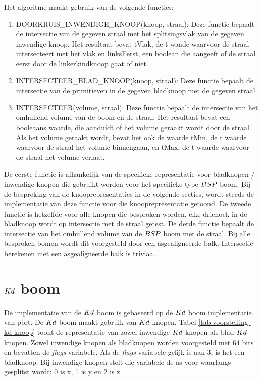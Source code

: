 Het algoritme maakt gebruik van de volgende functies:
\begin{enumerate}
    \item DOORKRUIS\_INWENDIGE\_KNOOP(knoop, straal): Deze functie bepaalt de intersectie van de gegeven straal met het splitsingsvlak van de gegeven inwendige knoop. Het resultaat bevat tVlak, de t waade waarvoor de straal intersecteert met het vlak en linksEerst, een boolean die aangeeft of de straal eerst door de linkerkindknoop gaat of niet.
    \item INTERSECTEER\_BLAD\_KNOOP(knoop, straal): Deze functie bepaalt de intersectie van de primitieven in de gegeven bladknoop met de gegeven straal.     
    \item INTERSECTEER(volume, straal): Deze functie bepaalt de intersectie van het omhullend volume van de boom en de straal. Het resultaat bevat een booleaans waarde, die aanduidt of het volume geraakt wordt door de straal. Als het volume geraakt wordt, bevat het ook de waarde tMin, de t waarde waarvoor de straal het volume binnengaan, en tMax, de t waarde waarvoor de straal het volume verlaat.
\end{enumerate}

De eerste functie is afhankelijk van de specifieke representatie voor bladknopen / inwendige knopen die gebruikt worden voor het specifieke type $BSP$ boom.
Bij de bespreking van de knooprepresentaties in de volgende secties, wordt steeds de implementatie van deze functie voor die knooprepresentatie getoond.
De tweede functie is hetzelfde voor alle knopen die besproken worden, elke driehoek in de bladknoop wordt op intersectie met de straal getest.
De derde functie bepaalt de intersectie van het omhullend volume van de $BSP$ boom met de straal. 
Bij alle besproken bomen wordt dit voorgesteld door een asgealigneerde balk.
Intersectie berekenen met een asgealigneerde balk is triviaal.

\section{$Kd$ boom}
\label{sec:h4-kd}

De implementatie van de $Kd$ boom is gebaseerd op de $Kd$ boom implementatie van pbrt.
De $Kd$ boom maakt gebruik van $Kd$ knopen. 
Tabel \ref{tab:voorstelling-kd-knoop} toont de representatie van zowel inwendige $Kd$ knopen als blad $Kd$ knopen. 
Zowel inwendige knopen als bladknopen worden voorgesteld met 64 bits en bevatten de \textit{flags} variabele.
Als de \textit{flags} variabele gelijk is aan 3, is het een bladknoop.
Bij inwendige knopen stelt die variabele de as voor waarlangs gesplitst wordt: 0 is x, 1 is y en 2 is z.\\

